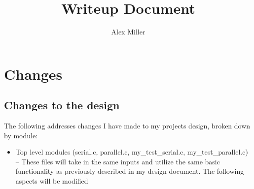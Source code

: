 \documentclass[]{article}
\title{Writeup Document}
\author{Alex Miller}
\begin{document}
\maketitle

\section{Changes}
\subsection{Changes to the design}
The following addresses changes I have made to my projects design, broken down by module:
\begin{itemize}
	\item Top level modules (serial.c, parallel.c, my\_test\_serial.c, my\_test\_parallel.c) -- These files will take in the same inputs and utilize the same basic functionality as previously described in my design document. The following aspects will be modified
	

\end{itemize}
\end{document}
